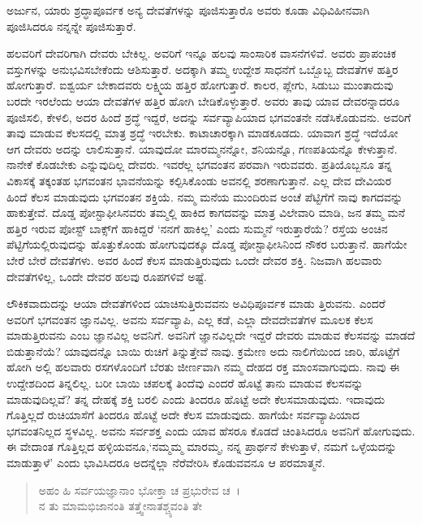 {\small ಅರ್ಜುನ, ಯಾರು ಶ್ರದ್ಧಾಪೂರ್ವಕ ಅನ್ಯ ದೇವತೆಗಳನ್ನು ಪೂಜಿಸುತ್ತಾರೊ ಅವರು ಕೂಡಾ ವಿಧಿವಿಹೀನವಾಗಿ ಪೂಜಿಸಿದರೂ ನನ್ನನ್ನೇ ಪೂಜಿಸುತ್ತಾರೆ.}

ಹಲವರಿಗೆ ದೇವರಿಗಾಗಿ ದೇವರು ಬೇಕಿಲ್ಲ. ಅವರಿಗೆ ಇನ್ನೂ ಹಲವು ಸಾಂಸಾರಿಕ ವಾಸನೆಗಳಿವೆ. ಅವರು ಪ್ರಾಪಂಚಿಕ ವಸ್ತುಗಳನ್ನು ಅನುಭವಿಸಬೇಕೆಂದು ಆಶಿಸುತ್ತಾರೆ. ಅದಕ್ಕಾಗಿ ತಮ್ಮ ಉದ್ದೇಶ ಸಾಧನೆಗೆ ಒಬ್ಬೊಬ್ಬ ದೇವತೆಗಳ ಹತ್ತಿರ ಹೋಗುತ್ತಾರೆ. ಐಶ್ವರ್ಯ ಬೇಕಾದವರು ಲಕ್ಷ್ಮಿಯ ಹತ್ತಿರ ಹೋಗುತ್ತಾರೆ. ಕಾಲರ, ಪ್ಲೇಗು, ಸಿಡುಬು ಮುಂತಾದುವು ಬರದೇ ಇರಲೆಂದು ಆಯಾ ದೇವತೆಗಳ ಹತ್ತಿರ ಹೋಗಿ ಬೇಡಿಕೊಳ್ಳುತ್ತಾರೆ. ಅವರು ತಾವು ಯಾವ ದೇವರನ್ನಾದರೂ ಪೂಜಿಸಲಿ, ಕೇಳಲಿ, ಅದರ ಹಿಂದೆ ಶ್ರದ್ಧೆ ಇದ್ದರೆ, ಅದನ್ನು ಸರ್ವವ್ಯಾಪಿಯಾದ ಭಗವಂತನೇ ನಡೆಸಿಕೊಡುವನು. ಅವರಿಗೆ ತಾವು ಮಾಡುವ ಕೆಲಸದಲ್ಲಿ ಮಾತ್ರ ಶ್ರದ್ಧೆ ಇರಬೇಕು. ಕಾಟಾಚಾರಕ್ಕಾಗಿ ಮಾಡಕೂಡದು. ಯಾವಾಗ ಶ್ರದ್ಧೆ ಇದೆಯೋ ಆಗ ದೇವರು ಅದನ್ನು ಲಾಲಿಸುತ್ತಾನೆ. ಯಾವುದೋ ಮಾರಮ್ಮನನ್ನೋ, ಶನಿಯನ್ನೊ, ಗಣಪತಿಯನ್ನೊ ಕೇಳುತ್ತಾನೆ. ನಾನೇಕೆ ಕೊಡಬೇಕು ಎನ್ನುವುದಿಲ್ಲ ದೇವರು. ಇವರೆಲ್ಲ ಭಗವಂತನ ಪರವಾಗಿ ಇರುವವರು. ಪ್ರತಿಯೊಬ್ಬನೂ ತನ್ನ ವಿಕಾಸಕ್ಕೆ ತಕ್ಕಂತಹ ಭಗವಂತನ ಭಾವನೆಯನ್ನು ಕಲ್ಪಿಸಿಕೊಂಡು ಅವನಲ್ಲಿ ಶರಣಾಗುತ್ತಾನೆ. ಎಲ್ಲ ದೇವ ದೇವಿಯರ ಹಿಂದೆ ಕೆಲಸ ಮಾಡುವುದು ಭಗವಂತನ ಶಕ್ತಿಯೆ. ನಮ್ಮ ಮನೆಯ ಮುಂದಿರುವ ಅಂಚೆ ಪೆಟ್ಟಿಗೆಗೆ ನಾವು ಕಾಗದವನ್ನು ಹಾಕುತ್ತೇವೆ. ದೊಡ್ಡ ಪೋಸ್ಟಾಫೀಸಿನವರು ತಮ್ಮಲ್ಲಿ ಹಾಕಿದ ಕಾಗದವನ್ನು ಮಾತ್ರ ವಿಲೇವಾರಿ ಮಾಡಿ, ಜನ ತಮ್ಮ ಮನೆ ಹತ್ತಿರ ಇರುವ ಪೋಸ್ಟ್ ಬಾಕ್ಸ್​ಗೆ ಹಾಕಿದ್ದರೆ ‘ನನಗೆ ಹಾಕಿಲ್ಲ’ ಎಂದು ಸುಮ್ಮನೆ ಇರುತ್ತಾರೆಯೆ? ರಸ್ತೆಯ ಅಂಚಿನ ಪೆಟ್ಟಿಗೆಯಲ್ಲಿರುವುದನ್ನು ಹೊತ್ತುಕೊಂಡು ಹೋಗುವುದಕ್ಕೂ ದೊಡ್ಡ ಪೋಸ್ಟಾಫೀಸಿನಿಂದ ನೌಕರ ಬರುತ್ತಾನೆ. ಹಾಗೆಯೇ ಬೇರೆ ಬೇರೆ ದೇವತೆಗಳು. ಅವರ ಹಿಂದೆ ಕೆಲಸ ಮಾಡುತ್ತಿರುವುದು ಒಂದೇ ದೇವರ ಶಕ್ತಿ. ನಿಜವಾಗಿ ಹಲವಾರು ದೇವತೆಗಳಿಲ್ಲ, ಒಂದೇ ದೇವರ ಹಲವು ರೂಪಗಳಿವೆ ಅಷ್ಟೆ.

ಲೌಕಿಕವಾದುದನ್ನು ಆಯಾ ದೇವತೆಗಳಿಂದ ಯಾಚಿಸುತ್ತಿರುವವನು ಅವಿಧಿಪೂರ್ವಕ ಮಾಡು ತ್ತಿರುವನು. ಎಂದರೆ ಅವರಿಗೆ ಭಗವಂತನ ಜ್ಞಾನವಿಲ್ಲ. ಅವನು ಸರ್ವವ್ಯಾಪಿ, ಎಲ್ಲ ಕಡೆ, ಎಲ್ಲಾ ದೇವದೇವತೆಗಳ ಮೂಲಕ ಕೆಲಸ ಮಾಡುತ್ತಿರುವನು ಎಂಬ ಜ್ಞಾನವಿಲ್ಲ ಅವನಿಗೆ. ಅವನಿಗೆ ಜ್ಞಾನವಿಲ್ಲದೇ ಇದ್ದರೆ ದೇವರು ಮಾಡುವ ಕೆಲಸವನ್ನು ಮಾಡದೆ ಬಿಡುತ್ತಾನೆಯೆ? ಯಾವುದನ್ನೊ ಬಾಯಿ ರುಚಿಗೆ ತಿನ್ನುತ್ತೇವೆ ನಾವು. ಕ್ರಮೇಣ ಅದು ನಾಲಿಗೆಯಿಂದ ಜಾರಿ, ಹೊಟ್ಟೆಗೆ ಹೋಗಿ ಅಲ್ಲಿ ಹಲವಾರು ರಸಗಳೊಂದಿಗೆ ಬೆರತು ಜೀರ್ಣವಾಗಿ ನಮ್ಮ ದೇಹದ ರಕ್ತ ಮಾಂಸವಾಗುವುದು. ನಾವು ಈ ಉದ್ದೇಶದಿಂದ ತಿನ್ನಲಿಲ್ಲ. ಬರೀ ಬಾಯಿ ಚಪಲಕ್ಕೆ ತಿಂದೆವು ಎಂದರೆ ಹೊಟ್ಟೆ ತಾನು ಮಾಡುವ ಕೆಲಸವನ್ನು ಮಾಡುವುದಿಲ್ಲವೆ? ತನ್ನ ದೇಹಕ್ಕೆ ಶಕ್ತಿ ಬರಲಿ ಎಂದು ತಿಂದರೂ ಹೊಟ್ಟೆ ಅದೇ ಕೆಲಸಮಾಡುವುದು. ಇದಾವುದು ಗೊತ್ತಿಲ್ಲದೆ ರುಚಿಯಾಸೆಗೆ ತಿಂದರೂ ಹೊಟ್ಟೆ ಅದೇ ಕೆಲಸ ಮಾಡುವುದು. ಹಾಗೆಯೇ ಸರ್ವವ್ಯಾಪಿಯಾದ ಭಗವಂತನಿಲ್ಲದ ಸ್ಥಳವಿಲ್ಲ. ಅವನು ಸರ್ವಶಕ್ತ ಎಂದು ಯಾವ ಹೆಸರೂ ಕೊಡದೆ ಚಿಂತಿಸಿದರೂ ಅವನಿಗೆ ಹೋಗುವುದು. ಈ ವೇದಾಂತ ಗೊತ್ತಿಲ್ಲದ ಹಳ್ಳಿಯವನೂ,‘ನಮ್ಮಮ್ಮ ಮಾರಮ್ಮ, ನನ್ನ ಪ್ರಾರ್ಥನೆ ಕೇಳುತ್ತಾಳೆ, ನಮಗೆ ಒಳ್ಳೆಯದನ್ನು ಮಾಡುತ್ತಾಳೆ’ ಎಂದು ಭಾವಿಸಿದರೂ ಅದನ್ನೆಲ್ಲಾ ನೆರೆವೇರಿಸಿ ಕೊಡುವವನೂ ಆ ಪರಮಾತ್ಮನೆ.

\begin{verse}
ಅಹಂ ಹಿ ಸರ್ವಯಜ್ಞಾನಾಂ ಭೋಕ್ತಾ ಚ ಪ್ರಭುರೇವ ಚ~।\\ನ ತು ಮಾಮಭಿಜಾನಂತಿ ತತ್ತ್ವೇನಾತಶ್ಚ್ಯವಂತಿ ತೇ 
\end{verse}

